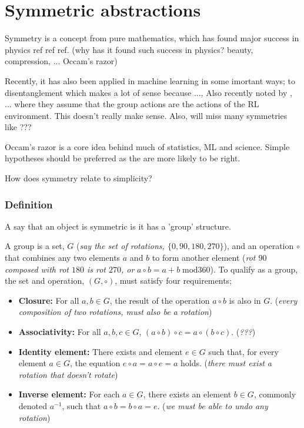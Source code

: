 \newpage
\section{Symmetric abstractions}\label{symmetric-abstractions}

Symmetry is a concept from pure mathematics, which has found major success in physics ref ref ref.
(why has it found such success in physics? beauty, compression, ... Occam's razor)

Recently, it has also been applied in machine learning in some imortant ways; to disentanglement \cite{Higgins2018} which makes a lot of sense because ...,
Also recently noted by \cite{Caselles-Dupre2019}, ... where they assume that
the group actions are the actions of the RL environment.
This doesn't really make sense. Also, will miss many symmetries like ???

Occam's razor is a core idea behind much of statistics, ML and science. Simple
hypotheses should be preferred as the are more likely to be right.

How does symmetry relate to simplicity?

\subsubsection{Definition}

A say that an object is symmetric is it has a 'group' structure.

A group is a set, $G$ (\textit{say the set of rotations, $\{0, 90, 180, 270\}$}),
and an operation $\circ$ that combines any two elements $a$ and $b$ to form
another element (\textit{rot $90$ composed with rot $180$ is rot $270$, or} $a \circ b = a + b \;\text{mod} 360$).
To qualify as a group, the set and operation, $(G, \circ)$, must satisfy four requirements;

\begin{itemize}
	\tightlist
	\item \textbf{Closure:} For all $a, b \in G$, the result of the operation $a \circ b$ is also in $G$. (\textit{every composition of two rotations, must also be a rotation})
	\item \textbf{Associativity:} For all $a,b,c \in G$, $(a\circ b) \circ c = a\circ (b\circ c)$. (\textit{???})
	\item \textbf{Identity element:} There exists and element $e\in G$ such that, for every element $a\in G$, the equation $e\circ a = a\circ e = a$ holds. (\textit{there must exist a rotation that doesn't rotate})
	\item \textbf{Inverse element:} For each $a \in G$, there exists an element $b \in G$, commonly denoted $a^{−1}$, such that $a \circ b = b \circ a = e$. (\textit{we must be able to undo any rotation})
\end{itemize}

